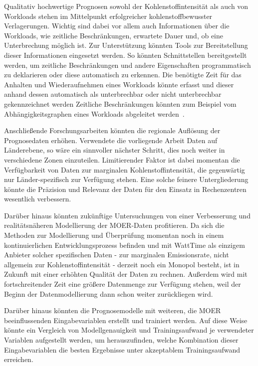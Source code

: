 Qualitativ hochwertige Prognosen sowohl der Kohlenstoffintensität als auch von Workloads stehen im Mittelpunkt erfolgreicher kohlenstoffbewusster Verlagerungen.
Wichtig sind dabei vor allem auch Informationen über die Workloads, wie zeitliche Beschränkungen, erwartete Dauer und, ob eine Unterbrechung möglich ist.
Zur Unterstützung könnten Tools zur Bereitstellung dieser Informationen eingesetzt werden.
So könnten Schnittstellen bereitgestellt werden, um zeitliche Beschränkungen und andere Eigenschaften programmatisch zu deklarieren oder diese automatisch zu erkennen.
Die benötigte Zeit für das Anhalten und Wiederaufnehmen eines Workloads könnte erfasst und dieser anhand dessen automatisch als unterbrechbar oder nicht unterbrechbar gekennzeichnet werden
Zeitliche Beschränkungen könnten zum Beispiel vom Abhängigkeitsgraphen eines Workloads abgeleitet werden~\cite{Wiesner.2021}.

Anschließende Forschungsarbeiten könnten die regionale Auflösung der Prognosedaten erhöhen.
Verwendete die vorliegende Arbeit Daten auf Länderebene, so wäre ein sinnvoller nächster Schritt, dies noch weiter in verschiedene Zonen einzuteilen.
Limitierender Faktor ist dabei momentan die Verfügbarkeit von Daten zur marginalen Kohlenstoffintensität, die gegenwärtig nur Länder-spezifisch zur Verfügung stehen.
Eine solche feinere Untergliederung könnte die Präzision und Relevanz der Daten für den Einsatz in Rechenzentren wesentlich verbessern.

Darüber hinaus könnten zukünftige Untersuchungen von einer Verbesserung und realitätsnäheren Modellierung der \ac{MOER}-Daten profitieren.
Da sich die Methoden zur Modellierung und Überprüfung momentan noch in einem kontinuierlichen Entwicklungsprozess befinden und mit WattTime als einzigem Anbieter solcher spezifischen Daten - zur marginalen Emissionsrate, nicht allgemein zur Kohlenstoffintensität - derzeit noch ein Monopol besteht, ist in Zukunft mit einer erhöhten Qualität der Daten zu rechnen.
Außerdem wird mit fortschreitender Zeit eine größere Datenmenge zur Verfügung stehen, weil der Beginn der Datenmodellierung dann schon weiter zurückliegen wird.

Darüber hinaus könnten die Prognosemodelle mit weiteren, die \ac{MOER} beeinflussenden Eingabevariablen erstellt und trainiert werden.
Auf diese Weise könnte ein Vergleich von Modellgenauigkeit und Trainingsaufwand je verwendeter Variablen aufgestellt werden, um herauszufinden, welche Kombination dieser Eingabevariablen die besten Ergebnisse unter akzeptablem Trainingsaufwand erreichen.


